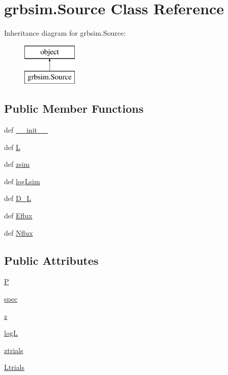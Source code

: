 \hypertarget{classgrbsim_1_1_source}{\section{grbsim.\-Source Class Reference}
\label{classgrbsim_1_1_source}
}
Inheritance diagram for grbsim.\-Source\-:\begin{figure}[H]
\begin{center}
\leavevmode
\includegraphics[height=2.000000cm]{classgrbsim_1_1_source}
\end{center}
\end{figure}
\subsection*{Public Member Functions}
\begin{DoxyCompactItemize}
\item 
def \hyperlink{classgrbsim_1_1_source_a6e483581eeabd09848f71dcdfb46a7bb}{\-\_\-\-\_\-init\-\_\-\-\_\-}
\item 
def \hyperlink{classgrbsim_1_1_source_ad56402a366d30bde07effb65c0645195}{L}
\item 
def \hyperlink{classgrbsim_1_1_source_abc5ca7a3ed742374da80d0cb60aad138}{zsim}
\item 
def \hyperlink{classgrbsim_1_1_source_a412a8b90423af5e02d62aeea10d896d8}{log\-Lsim}
\item 
def \hyperlink{classgrbsim_1_1_source_a0bf9a498b93dfa540547f658e5b4a631}{D\-\_\-\-L}
\item 
def \hyperlink{classgrbsim_1_1_source_a408e7cbd2964af597e37b8cce0934e3e}{Eflux}
\item 
def \hyperlink{classgrbsim_1_1_source_aa9e49ab85c24a8d50825fd733c6c16c9}{Nflux}
\end{DoxyCompactItemize}
\subsection*{Public Attributes}
\begin{DoxyCompactItemize}
\item 
\hyperlink{classgrbsim_1_1_source_a40756599695386befd7d94dea7c45c67}{P}
\item 
\hyperlink{classgrbsim_1_1_source_aa8feb6cf28391b9206c57f0b5ea1dd2a}{spec}
\item 
\hyperlink{classgrbsim_1_1_source_aa983a728c20508521a6e442d8692802a}{z}
\item 
\hyperlink{classgrbsim_1_1_source_a1c36aeb1b0caa2b1c72b1d9536e04999}{log\-L}
\item 
\hyperlink{classgrbsim_1_1_source_a49ad1adc6c791d565301090c86734bd3}{ztrials}
\item 
\hyperlink{classgrbsim_1_1_source_a80a43f13cc9341bb425fc1e29c799a79}{Ltrials}
\end{DoxyCompactItemize}


